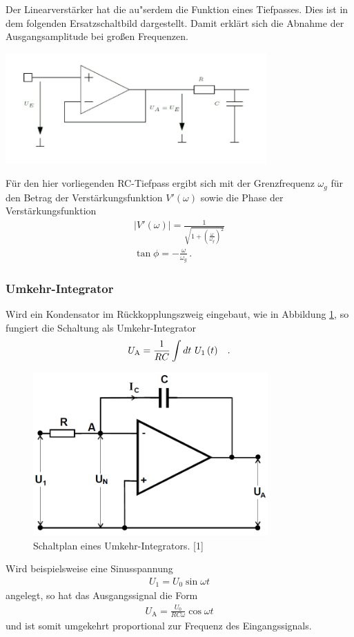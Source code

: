 \documentclass[]{scrartcl}
\begin{document}
Der Linearverstärker hat die au"serdem die Funktion eines Tiefpasses. Dies ist in dem folgenden Ersatzschaltbild dargestellt. Damit erklärt sich die Abnahme der Ausgangsamplitude bei großen Frequenzen.
\begin{center}
	\includegraphics[width=10cm]{images/tiefpass.png}
	\label{fig:tiefpass}
\end{center}
Für den hier vorliegenden RC-Tiefpass ergibt sich mit der Grenzfrequenz $\omega_g$ für den Betrag der Verstärkungsfunktion $V'(\omega)$ sowie die Phase der Verstärkungsfunktion
\begin{align}
|V'(\omega)|=\frac{1}{\sqrt{1+\left(\frac{\omega}{\omega_g}\right)^2}} 
\label{eq:tiefpass}\\
\tan\phi=-\frac{\omega}{\omega_g}\,.
\label{eq:tiefpass_phase}
\end{align} 

\subsubsection{Umkehr-Integrator}
Wird ein Kondensator im Rückkopplungszweig eingebaut, wie in Abbildung \ref{fig:schalplan_umkehrintegrator}, so fungiert die Schaltung als Umkehr-Integrator
\begin{align}
U_\text{A}= \frac{1}{RC}\int dt\ U_1\left(t\right)  \hspace{0.3cm}\text{.}
\end{align}
\begin{figure}[H]
\centering
\includegraphics[width=9cm]{images/schalplan_umkehrintegrator.png}
\caption{Schaltplan eines Umkehr-Integrators. [1]}
\label{fig:schalplan_umkehrintegrator}
\end{figure}
Wird beispielsweise eine Sinusspannung 
\begin{align}
U_1=U_0 \sin \omega t
\end{align}
angelegt, so hat das Ausgangssignal die Form
\begin{align}
U_\text{A} = \frac{U_0}{RC\omega}\cos \omega t
\end{align}
und ist somit umgekehrt proportional zur Frequenz des Eingangssignals.
\end{document}
